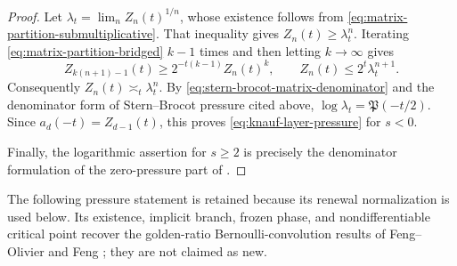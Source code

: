 \begin{proof}
Let \(\lambda_t=\lim_n Z_n(t)^{1/n}\), whose existence follows from
\eqref{eq:matrix-partition-submultiplicative}.  That inequality gives
\(Z_n(t)\ge\lambda_t^n\).  Iterating
\eqref{eq:matrix-partition-bridged} \(k-1\) times and then letting
\(k\to\infty\) gives
\[
 Z_{k(n+1)-1}(t)\ge2^{-t(k-1)}Z_n(t)^k,
 \qquad
 Z_n(t)\le2^t\lambda_t^{n+1}.
\]
Consequently \(Z_n(t)\asymp_t\lambda_t^n\).  By
\eqref{eq:stern-brocot-matrix-denominator} and the denominator form of
Stern--Brocot pressure cited above,
\(\log\lambda_t=\mathfrak P(-t/2)\).  Since
\(a_d(-t)=Z_{d-1}(t)\), this proves
\eqref{eq:knauf-layer-pressure} for \(s<0\).

Finally, the logarithmic assertion for \(s\ge2\) is precisely the
denominator formulation of the zero-pressure part of
\cite[Thm.~1.1]{KessebohmerStratmann2007}.
\end{proof}

The following pressure statement is retained because its renewal
normalization is used below.  Its existence, implicit branch, frozen phase,
and nondifferentiable critical point recover the golden-ratio
Bernoulli-convolution results of Feng--Olivier and Feng
\cite{FengOlivier2003,Feng2005}; they are not claimed as new.

